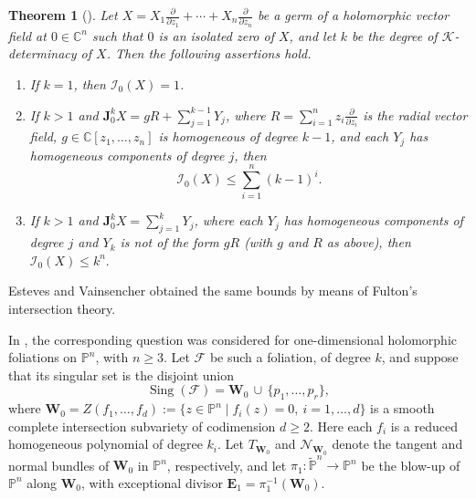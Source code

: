\documentclass[10pt,twoside]{amsart}
\numberwithin{equation}{section}
\newtheorem{theorem}[proposition]{Theorem}
\theoremstyle{definition}
\theoremstyle{remark}
\DeclareMathOperator{\sing}{Sing}
\newcommand{\C}{\mathbb{C}}
\newcommand{\pn}{\mathbb{P}^n}
\newcommand{\pnt}{\widetilde{\mathbb{P}}^n}
\newcommand{\fol}{\mathcal{F}}
\newcommand{\nn}{\mathcal{N}}
\newcommand{\W}{\mathbf{W}}
\newcommand{\E}{\mathbf{E}}
\begin{document}
\begin{theorem}[\cite{MGS}]\label{ms1}
Let $X = X_1\frac{\partial}{\partial z_1}+\cdots+X_n\frac{\partial}{\partial z_n}$
be a germ of a holomorphic vector field at $0 \in \C^n$ such that $0$ is an isolated
zero of $X$, and let $k$ be the degree of $\mathcal K$-determinacy of $X$.
Then the following assertions hold.
\begin{enumerate}
\item[(i)] If $k=1$, then $\mathcal I_0(X)=1$.
\item[(ii)] If $k>1$ and $\mathbf{J}_0^kX= gR+\sum_{j=1}^{k-1}Y_j$, where
$R=\sum_{i=1}^{n}z_i\frac{\partial}{\partial z_i}$ is the radial vector field,
$g\in\C[z_1,\ldots,z_n]$ is homogeneous of degree $k-1$, and each $Y_j$ has homogeneous
components of degree $j$, then
\[
\mathcal I_0(X)\leq \sum_{i=1}^{n}(k-1)^i.
\]
\item[(iii)] If $k>1$ and $\mathbf{J}_0^kX=\sum_{j=1}^{k}Y_j$, where each $Y_j$ has
homogeneous components of degree $j$ and $Y_k$ is not of the form $gR$ (with $g$ and $R$
as above), then
$
\mathcal I_0(X)\leq k^n.
$
\end{enumerate}
\end{theorem}

Esteves and Vainsencher \cite{EV} obtained the same bounds by means of Fulton's intersection theory.

In \cite{GC1,AG}, the corresponding question was considered for one-dimensional holomorphic foliations on $\pn$, with $n\geq3$. Let $\fol$ be such a foliation, of degree $k$, and suppose that its singular set is the disjoint union
\[
\sing(\fol)=\W_0 \,\cup\, \{p_1,\ldots,p_r\},
\]
where
$
\W_0 = Z(f_1,\ldots,f_d)
:=\{z\in \pn \mid f_i(z)=0,\ i=1,\ldots,d\}
$
is a smooth complete intersection subvariety of codimension $d\geq 2$.
Here each $f_i$ is a reduced homogeneous polynomial of degree $k_i$.
Let $T_{\W_0}$ and $\nn_{\W_0}$ denote the tangent and normal bundles of $\W_0$ in $\pn$,
respectively, and let $\pi_1:\pnt\to \pn$ be the blow-up of $\pn$ along $\W_0$,
with exceptional divisor $\E_1=\pi_1^{-1}(\W_0)$.
\end{document}
